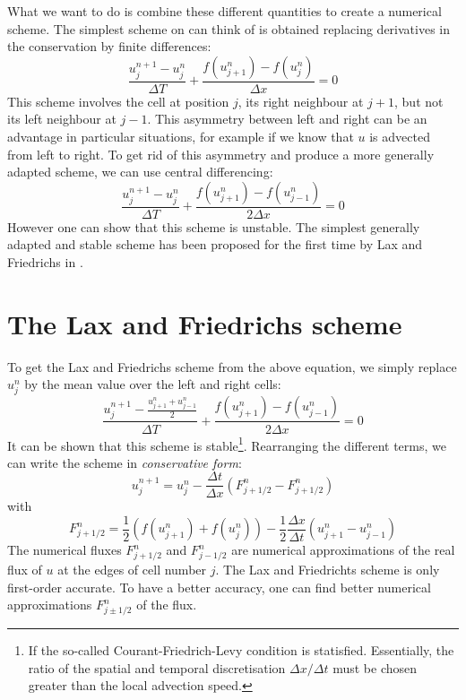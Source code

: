 What we want to do is combine these different quantities to create a numerical scheme. The simplest scheme on can think of is obtained replacing derivatives in the conservation by finite differences:
\begin{equation}
	\frac{u^{n+1}_j - u^n_j}{\Delta T} + \frac{f(u^n_{j+1}) - f(u^n_j)}{\Delta x} = 0
\end{equation} 
This scheme involves the cell at position $j$, its right neighbour at $j+1$, but not its left neighbour at $j-1$. This asymmetry between left and right can be an advantage in particular situations, for example if we know that $u$ is advected from left to right. To get rid of this asymmetry and produce a more generally adapted scheme, we can use central differencing:
\begin{equation}
	\frac{u^{n+1}_j - u^n_j}{\Delta T} + \frac{f(u^n_{j+1}) - f(u^n_{j-1})}{2\Delta x} = 0
\end{equation}
However one can show that this scheme is unstable. The simplest generally adapted and stable scheme has been proposed for the first time by Lax and Friedrichs  in \cite{lxf}.
\section{The Lax and Friedrichs scheme}

To get the Lax and Friedrichs scheme from the above equation, we simply replace $u^n_j$ by the mean value over the left and right cells:
\begin{equation}
		\frac{u^{n+1}_j - \frac{  u^n_{j+1} + u^n_{j-1}  }{ 2 } }{\Delta T} + \frac{f(u^n_{j+1}) - f(u^n_{j-1})}{2\Delta x} = 0
\end{equation}
It can be shown that this scheme is stable\footnote{If the so-called Courant-Friedrich-Levy condition is statisfied. Essentially, the ratio of the spatial and temporal discretisation $\Delta x/ \Delta t$ must be chosen greater than the local advection speed.}. Rearranging the different terms, we can write the scheme in \textit{conservative form}:
\begin{equation}
	u^{n+1}_j = u^n_j - \frac{\Delta t}{\Delta x} \left( F^n_{j+1/2}  - F^n_{j+1/2} \right) 
\end{equation}
with
\begin{equation}
	F^n_{j+1/2} = \frac{1}{2} \left( f(u^n_{j+1}) + f(u^n_{j}) \right) - \frac{1}{2} \frac{\Delta x}{\Delta t} \left( u^n_{j+1} - u^n_{j-1} \right)
\end{equation}
The numerical fluxes $F^n_{j+1/2}$ and $F^n_{j-1/2}$ are numerical approximations of the real flux of $u$ at the edges of cell number $j$.
The Lax and Friedrichts scheme is only first-order accurate. To have a better accuracy, one can find better numerical approximations $F^n_{j \pm 1/2}$ of the flux. 

